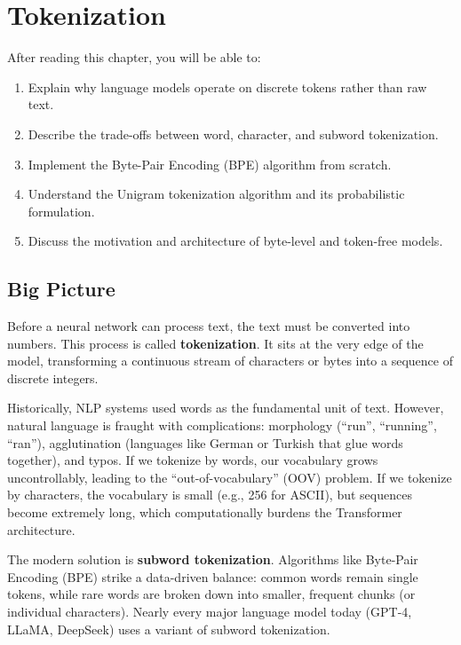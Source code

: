 \chapter{Tokenization}
\label{ch:07}

\begin{keyinsight}
After reading this chapter, you will be able to:
\begin{enumerate}
  \item Explain why language models operate on discrete tokens rather than raw text.
  \item Describe the trade-offs between word, character, and subword tokenization.
  \item Implement the Byte-Pair Encoding (BPE) algorithm from scratch.
  \item Understand the Unigram tokenization algorithm and its probabilistic formulation.
  \item Discuss the motivation and architecture of byte-level and token-free models.
\end{enumerate}
\end{keyinsight}

\section{Big Picture}
\label{ch:07:sec:big_picture}

Before a neural network can process text, the text must be converted into numbers. This process is called \textbf{tokenization}. It sits at the very edge of the model, transforming a continuous stream of characters or bytes into a sequence of discrete integers.

Historically, NLP systems used words as the fundamental unit of text. However, natural language is fraught with complications: morphology (``run'', ``running'', ``ran''), agglutination (languages like German or Turkish that glue words together), and typos. If we tokenize by words, our vocabulary grows uncontrollably, leading to the ``out-of-vocabulary'' (OOV) problem. If we tokenize by characters, the vocabulary is small (e.g., 256 for ASCII), but sequences become extremely long, which computationally burdens the Transformer architecture.

The modern solution is \textbf{subword tokenization}. Algorithms like Byte-Pair Encoding (BPE) strike a data-driven balance: common words remain single tokens, while rare words are broken down into smaller, frequent chunks (or individual characters). Nearly every major language model today (GPT-4, LLaMA, DeepSeek) uses a variant of subword tokenization.

